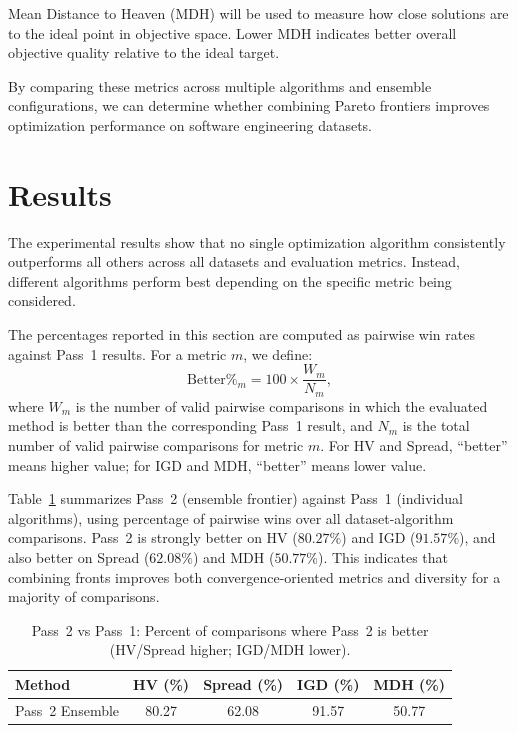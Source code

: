 \documentclass[sigconf,authorversion,nonacm]{acmart}
\begin{document}
Mean Distance to Heaven (MDH) will be used to measure how close solutions 
are to the ideal point in objective space. Lower MDH indicates better 
overall objective quality relative to the ideal target.

By comparing these metrics across multiple algorithms and ensemble 
configurations, we can determine whether combining Pareto frontiers 
improves optimization performance on software engineering datasets.


\section{Results}

The experimental results show that no single optimization algorithm 
consistently outperforms all others across all datasets and evaluation 
metrics. Instead, different algorithms perform best depending on the 
specific metric being considered.

The percentages reported in this section are computed as pairwise win rates 
against Pass~1 results. For a metric $m$, we define:
\[
\text{Better\%}_m = 100 \times \frac{W_m}{N_m},
\]
where $W_m$ is the number of valid pairwise comparisons in which the evaluated 
method is better than the corresponding Pass~1 result, and $N_m$ is the total 
number of valid pairwise comparisons for metric $m$. For HV and Spread, 
``better'' means higher value; for IGD and MDH, ``better'' means lower value.

Table~\ref{tab:pass2-vs-pass1} summarizes Pass~2 (ensemble frontier) against 
Pass~1 (individual algorithms), using percentage of pairwise wins over all 
dataset-algorithm comparisons. Pass~2 is strongly better on HV ($80.27\%$) 
and IGD ($91.57\%$), and also better on Spread ($62.08\%$) and MDH ($50.77\%$). 
This indicates that combining fronts improves both convergence-oriented metrics 
and diversity for a majority of comparisons.

\begin{table}[h]
\centering
\caption{Pass~2 vs Pass~1: Percent of comparisons where Pass~2 is better (HV/Spread higher; IGD/MDH lower).}
\label{tab:pass2-vs-pass1}
\begin{tabular}{lcccc}
\hline
Method & HV (\%) & Spread (\%) & IGD (\%) & MDH (\%) \\
\hline
Pass~2 Ensemble & 80.27 & 62.08 & 91.57 & 50.77 \\
\hline
\end{tabular}
\end{table}
\end{document}
